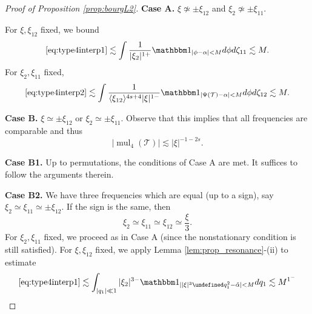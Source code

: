 \documentclass[a4paper,
11pt,  reqno]{amsart}
\newcommand{\jap}[1]{\langle #1 \rangle}
\newcommand{\5}{\textup{V}}
\newcommand{\noi}{\noindent}
\newcommand{\ind}{\mathbbm 1}
\theoremstyle{remark}
\newcommand{\R}{\mathbb{R}}
\newcommand{\bul}{\bullet}
\let\Re=\undefined\DeclareMathOperator*{\Re}{Re}
\newcommand{\TT}{\mathcal{T}}
\DeclareMathOperator{\mul}{mul}
\numberwithin{equation}{section}
\numberwithin{theorem}{section}
\begin{document}
\begin{proof}[Proof of Proposition \ref{prop:bourgL2}]
\smallskip
\noi\textbf{Case A.} $\xi\not\simeq \pm \xi_{12}$ and $\xi_2\not\simeq \pm \xi_{11}$.

\noi For $\xi, \xi_{12}$ fixed, we bound
\begin{equation}\label{eq:typeIVest1}
\eqref{eq:type4interp1}\lesssim \int \frac{1}{|\xi_2|^{1+}}\ind_{|\phi-\alpha|<M}d\phi d\zeta_{11} \lesssim M.
\end{equation}
For $\xi_2, \xi_{11}$ fixed,
\begin{equation}\label{eq:typeIVest2}
\eqref{eq:type4interp2} \lesssim \int \frac{1}{\jap{\xi_{12}}^{4s+4}|\xi|^{1-}}\ind_{|\Psi(\TT)-\alpha|<M}d\phi d\zeta_{12} \lesssim M.
\end{equation}

\smallskip
\noi
\textbf{Case B.} $\xi\simeq \pm \xi_{12}$ or $\xi_2\simeq \pm \xi_{11}$. Observe that this implies that all frequencies are comparable and thus
$$
|\mul_4(\TT)|\lesssim |\xi|^{-1-2s}.
$$

\smallskip
\noi
\textbf{Case B1.} Up to permutations, the conditions of Case A are met. It suffices to follow the arguments therein.

\smallskip
\noi
\textbf{Case B2.} We have three frequencies which are equal (up to a sign), say $\xi_2\simeq  \xi_{11} \simeq \pm \xi_{12}$. If the sign is the same, then
$$
\xi_2\simeq \xi_{11}\simeq \xi_{12} \simeq \frac{\xi}{3}.
$$
For $\xi_2, \xi_{11}$ fixed, we proceed as in Case A (since the nonstationary condition is still satisfied). For $\xi, \xi_{12}$ fixed, we apply Lemma \ref{lem:prop_resonance}-(ii) to estimate
\begin{align}
\eqref{eq:type4interp1}\lesssim \int_{|q_1|\ll 1} |\xi_2|^{3-}\ind_{||\xi|^3\Re q_1^2 - \Tilde{\alpha}|<M} dq_1 \lesssim M^{1^-}
\end{align}



\end{proof}
\end{document}
